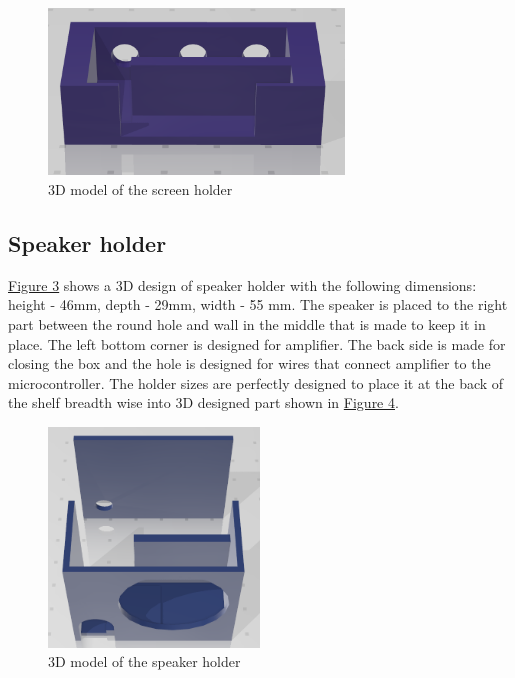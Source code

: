 \documentclass{article}
\begin{document}
\begin{figure}[H]
    \begin{center}
        \includegraphics[width=0.7\textwidth]{3d/screen_holder.png}
    \end{center}
    \caption{3D model of the screen holder}
    \label{fig:screen}
\end{figure}

\subsection{Speaker holder}
\hyperref[fig:speaker]{Figure 3} shows a 3D design of speaker holder with the following dimensions: height - 46mm, depth - 29mm, width - 55 mm. The speaker is placed to the right part between the round hole and wall in the middle that is made to keep it in place. The left bottom corner is designed for amplifier. The back side is made for closing the box and the hole is designed for wires that connect amplifier to the microcontroller. The holder sizes are perfectly designed to place it at the back of the shelf breadth wise into 3D designed part shown in \hyperref[fig:shelf-back]{Figure 4}.
\begin{figure}[H]
    \begin{center}
        \includegraphics[width=0.5\textwidth]{3d/speaker.png}
    \end{center}
    \caption{3D model of the speaker holder}
    \label{fig:speaker}
\end{figure}
\end{document}
